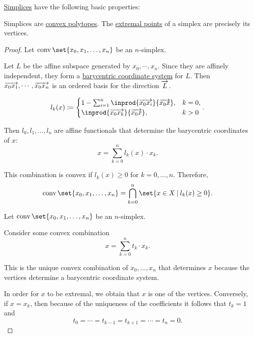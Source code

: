 \begin{proposition}\label{thm:def:simplex}
  \hyperref[def:simplex]{Simplices} have the following basic properties:
  \begin{thmenum}
     Simplices are \hyperref[def:convex_polytope]{convex polytopes}.
     The \hyperref[def:extremal_point]{extremal points} of a simplex are precisely its vertices.
  \end{thmenum}
\end{proposition}
\begin{proof}
   Let \( \conv\set{ x_0, x_1, \ldots, x_n } \) be an \( n \)-simplex.

  Let \( L \) be the affine subspace generated by \( x_0, \cdots, x_n \). Since they are affinely independent, they form a \hyperref[def:barycentric_coordinate_system]{barycentric coordinate system} for \( L \). Then \( \overrightarrow{x_0 x_1}, \cdots, \overrightarrow{x_0 x_n} \) is an ordered basis for the direction \( \overrightarrow{L} \).

  \begin{equation*}
    l_k(x) \coloneqq \begin{cases}
      1 - \sum_{i=1}^n \inprod {\vect{x_0 x_i}} {\vect{x_0 x}}, &k = 0, \\
      \inprod {\vect{x_0 x_k}} {\vect{x_0 x}},                  &k > 0
    \end{cases}.
  \end{equation*}

  Then \( l_0, l_1, \ldots, l_n \) are affine functionals that determine the barycentric coordinates of \( x \):
  \begin{equation*}
    x = \sum_{k=0}^n l_k(x) \cdot x_k.
  \end{equation*}

  This combination is convex if \( l_k(x) \geq 0 \) for \( k = 0, \ldots, n \). Therefore,
  \begin{equation*}
    \conv\set{ x_0, x_1, \ldots, x_n } = \bigcap_{k=0}^n \set{ x \in X \given l_k(x) \geq 0 }.
  \end{equation*}

   Let \( \conv\set{ x_0, x_1, \ldots, x_n } \) be an \( n \)-simplex.

  Consider some convex combination
  \begin{equation*}
    x = \sum_{k=0}^n t_k \cdot x_k.
  \end{equation*}

  This is the unique convex combination of \( x_0, \ldots, x_n \) that determines \( x \) because the vertices determine a barycentric coordinate system.

  In order for \( x \) to be extremal, we obtain that \( x \) is one of the vertices. Conversely, if \( x = x_k \), then because of the uniqueness of the coefficients it follows that \( t_k = 1 \) and
  \begin{equation*}
    t_0 = \cdots = t_{k-1} = t_{k+1} = \cdots = t_n = 0.
  \end{equation*}
\end{proof}
